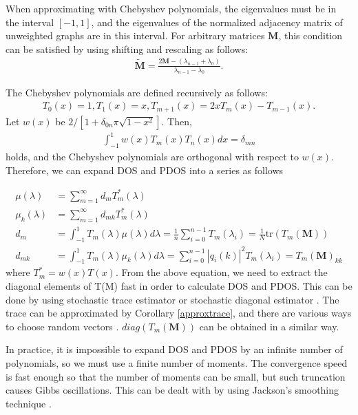 \documentclass[senior,final,11pt]{iscs-thesis}
\begin{document}
When approximating with Chebyshev polynomials, the eigenvalues must be in the interval $[-1,1]$, and the eigenvalues of the normalized adjacency matrix of unweighted graphs are in this interval. For arbitrary matrices ${\mathbf M}$, this condition can be satisfied by using shifting and rescaling as follows:
\begin{align*}
    {\mathbf {\widetilde M}} = \frac{2{\mathbf M} - (\lambda_{n-1} + \lambda_0)}{\lambda_{n-1}-\lambda_0}.
\end{align*}

The Chebyshev polynomials are defined recursively as follows:
\begin{align*}
    T_0(x)=1, T_1(x)=x, T_{m+1}(x) = 2xT_m(x)-T_{m-1}(x).
\end{align*}
Let $w(x)$ be $2/[1+\delta_{0n}\pi \sqrt{1-x^2}]$. Then,
\begin{align*}
    \int_{-1}^{1}w(x)T_m(x)T_n(x)dx = \delta_{mn}
\end{align*}
holds, and the Chebyshev polynomials are orthogonal with respect to $w(x)$. Therefore, we can expand DOS and PDOS into a series as follows

\begin{align}
    \mu(\lambda) &= \sum_{m=1}^{\infty} d_m T^*_m(\lambda) \\
    \mu_k(\lambda) &=  \sum_{m=1}^{\infty} d_{mk} T^*_m(\lambda) \\
    d_m &= \int_{-1}^{1}T_m(\lambda)\mu(\lambda)d\lambda = \frac{1}{n}\sum_{i=0}^{n-1}T_{m}(\lambda_i) = \frac{1}{N}\mathrm{tr}(T_m({\mathbf M})) \\
    d_{mk} &= \int_{-1}^{1}T_m(\lambda)\mu_k(\lambda)d\lambda = \sum_{i=0}^{n-1}|q_i(k)|^2 T_{m}(\lambda_i) = T_m({\mathbf M})_{kk}
\end{align}
where $T^*_m = w(x)T(x)$. From the above equation, we need to extract the diagonal elements of T(M) fast in order to calculate DOS and PDOS. This can be done by using stochastic trace estimator \cite{hutchinson1989stochastic} or stochastic diagonal estimator \cite{bekas2007estimator}. The trace can be approximated by Corollary \ref{approxtrace}, and there are various ways to choose random vectors \cite{avron2011randomized}. $diag(T_m({\mathbf M}))$ can be obtained in a similar way.

In practice, it is impossible to expand DOS and PDOS by an infinite number of polynomials, so we must use a finite number of moments. The convergence speed is fast enough so that the number of moments can be small, but such truncation causes Gibbs oscillations. This can be dealt with by using Jackson's smoothing technique \cite{jackson1911genauigkeit,dong2019network}.
\end{document}

